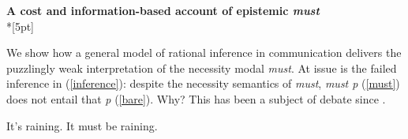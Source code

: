 \documentclass[11pt]{article}
\begin{document}
\begin{center}\textbf{A cost and information-based account of epistemic \textit{must}}\\*[5pt]
\end{center}

\vspace{-11pt}


We show how a general model of rational inference in communication delivers the puzzlingly weak interpretation of the necessity modal \emph{must}. At issue is the failed inference in (\ref{inference}): despite the necessity semantics of \emph{must}, \emph{must p} (\ref{must}) does not entail that \emph{p} (\ref{bare}). Why? This has been a subject of debate since \cite{karttunen1972}.

\vspace{-8pt}
\begin{exe}
\ex\label{inference} 
\begin{xlist}
\ex\label{bare}  It's raining.
\ex\label{must} It must be raining.
\end{xlist}
\end{exe}
\vspace{-8pt}
\end{document}
